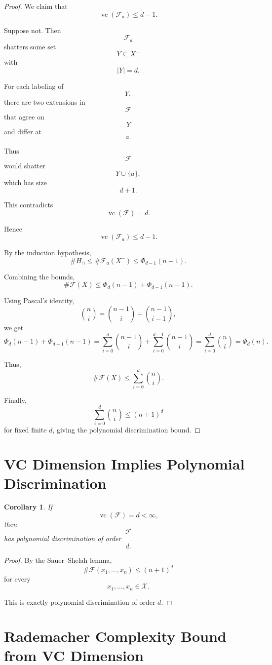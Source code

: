 \documentclass[12pt,oneside]{book}
\numberwithin{equation}{section}
\theoremstyle{definition}
\theoremstyle{plain}
\newtheorem{corollary}{Corollary}[section]
\theoremstyle{remark}
\begin{document}
\begin{proof}
We claim that
\[
\operatorname{vc}(\mathcal{F}_a)\leq d-1.
\]

Suppose not. Then
\[
\mathcal{F}_a
\]
shatters some set
\[
Y\subseteq X^-
\]
with
\[
|Y|=d.
\]

For each labeling of
\[
Y,
\]
there are two extensions in
\[
\mathcal{F}
\]
that agree on
\[
Y
\]
and differ at
\[
a.
\]

Thus
\[
\mathcal{F}
\]
would shatter
\[
Y\cup\{a\},
\]
which has size
\[
d+1.
\]

This contradicts
\[
\operatorname{vc}(\mathcal{F})=d.
\]

Hence
\[
\operatorname{vc}(\mathcal{F}_a)\leq d-1.
\]

By the induction hypothesis,
\[
\#H_{\cap}
\leq
\#\mathcal{F}_a(X^-)
\leq
\Phi_{d-1}(n-1).
\]

Combining the bounds,
\[
\#\mathcal{F}(X)
\leq
\Phi_d(n-1)+\Phi_{d-1}(n-1).
\]

Using Pascal's identity,
\[
\binom{n}{i}
=
\binom{n-1}{i}
+
\binom{n-1}{i-1},
\]
we get
\[
\Phi_d(n-1)+\Phi_{d-1}(n-1)
=
\sum_{i=0}^d \binom{n-1}{i}
+
\sum_{i=0}^{d-1}\binom{n-1}{i}
=
\sum_{i=0}^d \binom{n}{i}
=
\Phi_d(n).
\]

Thus,
\[
\#\mathcal{F}(X)
\leq
\sum_{i=0}^d \binom{n}{i}.
\]

Finally,
\[
\sum_{i=0}^d \binom{n}{i}
\leq
(n+1)^d
\]
for fixed finite $d$, giving the polynomial discrimination bound.
\end{proof}

\section{VC Dimension Implies Polynomial Discrimination}

\begin{corollary}
If
\[
\operatorname{vc}(\mathcal{F})=d<\infty,
\]
then
\[
\mathcal{F}
\]
has polynomial discrimination of order
\[
d.
\]
\end{corollary}

\begin{proof}
By the Sauer--Shelah lemma,
\[
\#\mathcal{F}(x_1,\dots,x_n)
\leq
(n+1)^d
\]
for every
\[
x_1,\dots,x_n\in\mathcal{X}.
\]

This is exactly polynomial discrimination of order $d$.
\end{proof}

\section{Rademacher Complexity Bound from VC Dimension}
\end{document}
